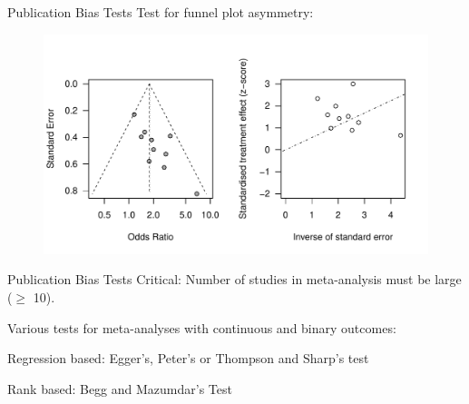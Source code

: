 \documentclass[english]{beamer}\usepackage[]{graphicx}\usepackage[]{color}
\makeatletter
\def\maxwidth{ %
  \ifdim\Gin@nat@width>\linewidth
    \linewidth
  \else
    \Gin@nat@width
  \fi
}
\newenvironment{knitrout}{}{} %
\makeatother
\begin{document}
\begin{frame}{Publication Bias Tests}
Test for funnel plot asymmetry:

\vspace{-1cm}
\begin{figure}
\begin{knitrout}
\color{fgcolor}
\includegraphics[width=\maxwidth]{figure/unnamed-chunk-6-1} 

\end{knitrout}
\end{figure}
\end{frame}

\begin{frame}{Publication Bias Tests}
Critical: Number of studies in meta-analysis must be large ($\geq$ 10).

Various tests for meta-analyses with continuous and binary outcomes:

Regression based: Egger's, Peter's or Thompson and Sharp's test

Rank based: Begg and Mazumdar's Test
\end{frame}
% 
% 
% 
% 
% 
% 
% 
% 
% 
% 
\end{document}
